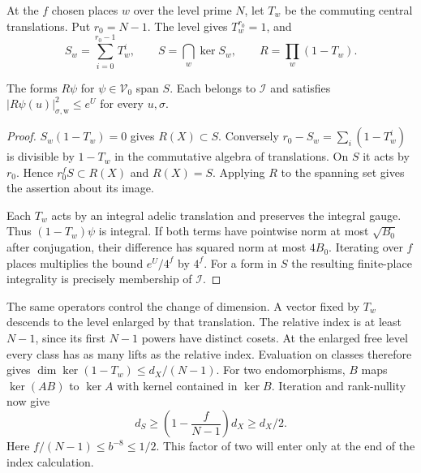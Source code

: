 At the $f$ chosen places $w$ over the level prime $N$, let $T_w$ be the commuting central translations. Put $r_0=N-1$. The level gives $T_w^{r_0}=1$, and
\[
 S_w=\sum_{i=0}^{r_0-1}T_w^i,\qquad
 S=\bigcap_w\ker S_w,\qquad R=\prod_w(1-T_w).
\]

\begin{chatAlemma}\label{A:ram}
The forms $R\psi$ for $\psi\in\mathcal V_0$ span $S$. Each belongs to $\mathcal I$ and satisfies $|R\psi(u)|_{\sigma,\mathrm w}^2\le e^U$ for every $u,\sigma$.
\end{chatAlemma}
\begin{proof}
$S_w(1-T_w)=0$ gives $R(X)\subset S$. Conversely $r_0-S_w=\sum_i(1-T_w^i)$ is divisible by $1-T_w$ in the commutative algebra of translations. On $S$ it acts by $r_0$. Hence $r_0^f S\subset R(X)$ and $R(X)=S$. Applying $R$ to the spanning set gives the assertion about its image.

Each $T_w$ acts by an integral adelic translation and preserves the integral gauge. Thus $(1-T_w)\psi$ is integral. If both terms have pointwise norm at most $\sqrt{B_0}$ after conjugation, their difference has squared norm at most $4B_0$. Iterating over $f$ places multiplies the bound $e^U/4^f$ by $4^f$. For a form in $S$ the resulting finite-place integrality is precisely membership of $\mathcal I$.
\end{proof}

The same operators control the change of dimension. A vector fixed by $T_w$ descends to the level enlarged by that translation. The relative index is at least $N-1$, since its first $N-1$ powers have distinct cosets. At the enlarged free level every class has as many lifts as the relative index. Evaluation on classes therefore gives $\dim\ker(1-T_w)\le d_X/(N-1)$. For two endomorphisms, $B$ maps $\ker(AB)$ to $\ker A$ with kernel contained in $\ker B$. Iteration and rank-nullity now give
\begin{equation}
 d_S\ge\left(1-\frac f{N-1}\right)d_X\ge d_X/2.\label{A:dimension}
\end{equation}
Here $f/(N-1)\le b^{-8}\le1/2$. This factor of two will enter only at the end of the index calculation.

